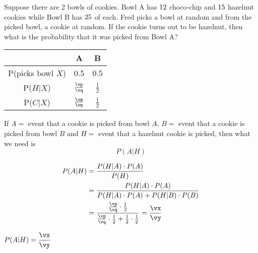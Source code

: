 

\question[3] Suppose there are 2 bowls of cookies. Bowl A has $12$ choco-chip and $15$ 
	hazelnut cookies while Bowl B has $25$ of each. Fred picks a bowl at random 
	and from the picked bowl, a cookie at random. If the cookie turns out to be 
	hazelnut, then what is the probability that it was picked from Bowl A?

\watchout

\ADD\va\vb\vd
\FRACTIONSIMPLIFY\va\vd\vm\vn
\FRACTIONSIMPLIFY\vb\vd\vp\vq
\FRACADD\vp{}\vj\vk
\FRACDIV\vp\vq\vj\vk\vx\vy

\ifprintanswers
		\begin{tabular}{ccc}
		   \toprule
		   & A & B \\
		   \midrule
		   P(picks bowl $X$) & 0.5 & 0.5 \\
		   P($H\vert X$) & $\frac\vp\vq$ & $\frac{1}{2}$ \\
		   P($C\vert X$) & $\frac\vm\vn$ & $\frac{1}{2}$ \\
		   \bottomrule
		\end{tabular}
\fi 

\begin{solution}[\halfpage]
  If $A=$ event that a cookie is picked from bowl $A$, $B=$ event that a cookie 
  is picked from bowl $B$ and $H=$ event that a hazelnut cookie is picked, then
  what we need is 
  \[ P(A\vert H) \]

	\begin{align}
		P(A \vert H) &= \dfrac{P(H \vert A) \cdot P(A)}{P(H)} \\
		  &= \dfrac{P(H \vert A) \cdot P(A)}{P(H \vert A)\cdot P(A) + P(H \vert B)\cdot P(B)} \\
      &= \dfrac{\frac\vp\vq\cdot\frac{1}{2}}{\frac\vp\vq\cdot\frac{1}{2}+\frac{1}{2}\cdot\frac{1}{2}} = \dfrac\vx\vy
	\end{align}

\end{solution}

\ifprintanswers
  \begin{codex}
    $P(A\vert H) = \dfrac\vx\vy$
  \end{codex}
\fi
